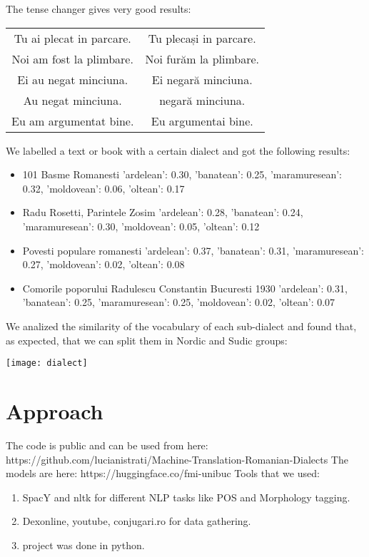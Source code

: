 \documentclass[11pt]{article}
\begin{document}
The tense changer gives very good results:
\begin{center}
\begin{tabular}{ |c|c| }
 \hline
 Tu ai plecat in parcare. & Tu plecași in parcare. \\
 Noi am fost la plimbare. & Noi furăm la plimbare.  \\
 Ei au negat minciuna. & Ei negară minciuna.  \\
 Au negat minciuna. & negară minciuna.  \\
 Eu am argumentat bine. & Eu argumentai bine.  \\
 \hline
\end{tabular}
\end{center}

We labelled a text or book with a certain dialect and got the following results:
\begin{itemize}
	\item 101 Basme Romanesti {'ardelean': 0.30, 'banatean': 0.25, 'maramuresean': 0.32, 'moldovean': 0.06, 'oltean': 0.17}
	\item Radu Rosetti, Parintele Zosim {'ardelean': 0.28, 'banatean': 0.24, 'maramuresean': 0.30, 'moldovean': 0.05, 'oltean': 0.12}
 	\item Povesti populare romanesti {'ardelean': 0.37, 'banatean': 0.31, 'maramuresean': 0.27, 'moldovean': 0.02, 'oltean': 0.08}
 	\item Comorile poporului Radulescu Constantin Bucuresti 1930 {'ardelean': 0.31, 'banatean': 0.25, 'maramuresean': 0.25, 'moldovean': 0.02, 'oltean': 0.07}
\end{itemize}

We analized the similarity of the vocabulary of each sub-dialect and found that, as expected, that we can split them in Nordic and Sudic groups:
\graphicspath{ {./images/} }
\texttt{[image: dialect]}



\section{Approach}
\label{section:approach}

The code is public and can be used from here: https://github.com/lucianistrati/Machine-Translation-Romanian-Dialects
The models are here:  https://huggingface.co/fmi-unibuc
Tools that we used:
\begin{enumerate}
 	\item SpacY and nltk for different NLP tasks like POS and Morphology tagging.
	\item Dexonline, youtube, conjugari.ro for data gathering.
	\item project was done in python.
\end{enumerate}
\end{document}
